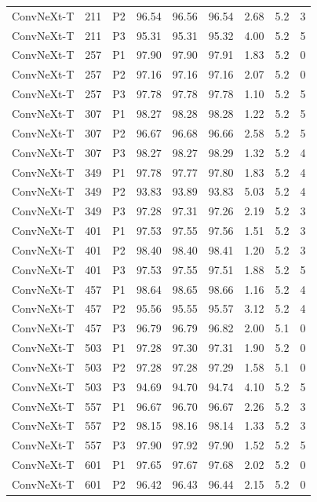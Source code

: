 {\begin{longtable}{lrlrrrrrr}
ConvNeXt-T & 211 & P2 & 96.54 & 96.56 & 96.54 & 2.68 & 5.2 & 3 \\
ConvNeXt-T & 211 & P3 & 95.31 & 95.31 & 95.32 & 4.00 & 5.2 & 5 \\
ConvNeXt-T & 257 & P1 & 97.90 & 97.90 & 97.91 & 1.83 & 5.2 & 0 \\
ConvNeXt-T & 257 & P2 & 97.16 & 97.16 & 97.16 & 2.07 & 5.2 & 0 \\
ConvNeXt-T & 257 & P3 & 97.78 & 97.78 & 97.78 & 1.10 & 5.2 & 5 \\
ConvNeXt-T & 307 & P1 & 98.27 & 98.28 & 98.28 & 1.22 & 5.2 & 5 \\
ConvNeXt-T & 307 & P2 & 96.67 & 96.68 & 96.66 & 2.58 & 5.2 & 5 \\
ConvNeXt-T & 307 & P3 & 98.27 & 98.27 & 98.29 & 1.32 & 5.2 & 4 \\
ConvNeXt-T & 349 & P1 & 97.78 & 97.77 & 97.80 & 1.83 & 5.2 & 4 \\
ConvNeXt-T & 349 & P2 & 93.83 & 93.89 & 93.83 & 5.03 & 5.2 & 4 \\
ConvNeXt-T & 349 & P3 & 97.28 & 97.31 & 97.26 & 2.19 & 5.2 & 3 \\
ConvNeXt-T & 401 & P1 & 97.53 & 97.55 & 97.56 & 1.51 & 5.2 & 3 \\
ConvNeXt-T & 401 & P2 & 98.40 & 98.40 & 98.41 & 1.20 & 5.2 & 3 \\
ConvNeXt-T & 401 & P3 & 97.53 & 97.55 & 97.51 & 1.88 & 5.2 & 5 \\
ConvNeXt-T & 457 & P1 & 98.64 & 98.65 & 98.66 & 1.16 & 5.2 & 4 \\
ConvNeXt-T & 457 & P2 & 95.56 & 95.55 & 95.57 & 3.12 & 5.2 & 4 \\
ConvNeXt-T & 457 & P3 & 96.79 & 96.79 & 96.82 & 2.00 & 5.1 & 0 \\
ConvNeXt-T & 503 & P1 & 97.28 & 97.30 & 97.31 & 1.90 & 5.2 & 0 \\
ConvNeXt-T & 503 & P2 & 97.28 & 97.28 & 97.29 & 1.58 & 5.1 & 0 \\
ConvNeXt-T & 503 & P3 & 94.69 & 94.70 & 94.74 & 4.10 & 5.2 & 5 \\
ConvNeXt-T & 557 & P1 & 96.67 & 96.70 & 96.67 & 2.26 & 5.2 & 3 \\
ConvNeXt-T & 557 & P2 & 98.15 & 98.16 & 98.14 & 1.33 & 5.2 & 3 \\
ConvNeXt-T & 557 & P3 & 97.90 & 97.92 & 97.90 & 1.52 & 5.2 & 5 \\
ConvNeXt-T & 601 & P1 & 97.65 & 97.67 & 97.68 & 2.02 & 5.2 & 0 \\
ConvNeXt-T & 601 & P2 & 96.42 & 96.43 & 96.44 & 2.15 & 5.2 & 0 \\

\end{longtable}}
